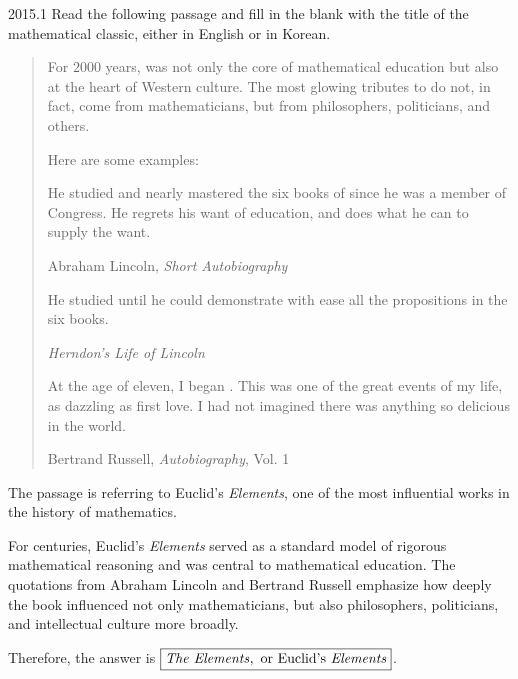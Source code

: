     \begin{pastproblem}{2015.1}
        Read the following passage and fill in the blank with the title of the mathematical classic,
        either in English or in Korean.

        \begin{quote}
            For $2000$ years, \underline{\hspace{2cm}} was not only the core of mathematical
            education but also at the heart of Western culture. The most glowing tributes to
            \underline{\hspace{2cm}} do not, in fact, come from mathematicians, but from
            philosophers, politicians, and others.

            Here are some examples:
            \begin{problemchoices}
                \item He studied and nearly mastered the six books of \underline{\hspace{2cm}}
                      since he was a member of Congress. He regrets his want of education, and does
                      what he can to supply the want.

                      \hfill Abraham Lincoln, \textit{Short Autobiography}

                \item He studied \underline{\hspace{2cm}} until he could demonstrate with ease
                      all the propositions in the six books.

                      \hfill \textit{Herndon's Life of Lincoln}

                \item At the age of eleven, I began \underline{\hspace{2cm}}. This was one of
                      the great events of my life, as dazzling as first love. I had not imagined
                      there was anything so delicious in the world.

                      \hfill Bertrand Russell, \textit{Autobiography}, Vol. 1
            \end{problemchoices}
        \end{quote}
    \end{pastproblem}

    \begin{solution}
        The passage is referring to Euclid's \textit{Elements}, one of the most influential works in
        the history of mathematics.

        For centuries, Euclid's \textit{Elements} served as a standard model of rigorous
        mathematical reasoning and was central to mathematical education. The quotations from
        Abraham Lincoln and Bertrand Russell emphasize how deeply the book influenced not only
        mathematicians, but also philosophers, politicians, and intellectual culture more broadly.

        Therefore, the answer is $\boxed{\text{\textit{The Elements}},\ \text{or Euclid's
        \textit{Elements}}}$.
    \end{solution}

